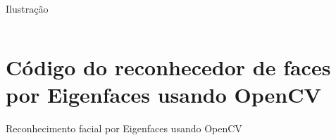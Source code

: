 \begin{apendicesenv}
\begin{code}
\caption{Ilustração }
\label{cod:pca_opencv}
\inputminted{python}{codigos/eigenfaces.py}
\end{code}

\chapter{Código do reconhecedor de faces por Eigenfaces usando OpenCV}\label{cap:eigenfaces_opencv}

\begin{code}
\caption{Reconhecimento facial por Eigenfaces usando OpenCV}
\label{cod:eigenfaces_opencv}
\inputminted{python}{codigos/eigenfaces.py}
\end{code}

\end{apendicesenv}
